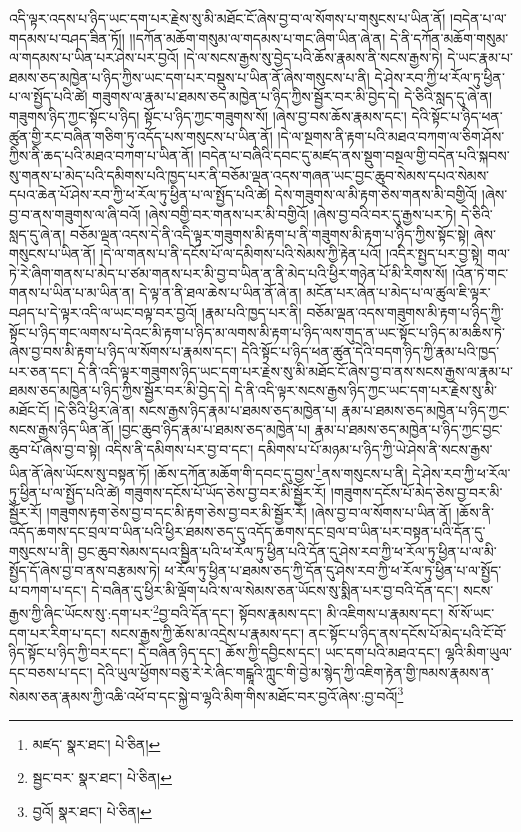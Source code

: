 འདི་ལྟར་འདས་པ་ཉིད་ཡང་དག་པར་རྗེས་སུ་མི་མཐོང་ངོ་ཞེས་བྱ་བ་ལ་སོགས་པ་གསུངས་པ་ཡིན་ནོ། །བདེན་པ་ལ་གདམས་པ་བཤད་ཟིན་ཏོ།། །།དཀོན་མཆོག་གསུམ་ལ་གདམས་པ་གང་ཞིག་ཡིན་ཞེ་ན། དེ་ནི་དཀོན་མཆོག་གསུམ་ལ་གདམས་པ་ཡིན་པར་ཤེས་པར་བྱའོ། །དེ་ལ་སངས་རྒྱས་སུ་བྱེད་པའི་ཆོས་རྣམས་ནི་སངས་རྒྱས་ཏེ། དེ་ཡང་རྣམ་པ་ཐམས་ཅད་མཁྱེན་པ་ཉིད་ཀྱིས་ཡང་དག་པར་བསྡུས་པ་ཡིན་ནོ་ཞེས་གསུངས་པ་ནི། དེ་ཤེས་རབ་ཀྱི་ཕ་རོལ་ཏུ་ཕྱིན་པ་ལ་སྤྱོད་པའི་ཚེ། གཟུགས་ལ་རྣམ་པ་ཐམས་ཅད་མཁྱེན་པ་ཉིད་ཀྱིས་སྦྱོར་བར་མི་བྱེད་དེ། དེ་ཅིའི་སླད་དུ་ཞེ་ན། གཟུགས་ཉིད་ཀྱང་སྟོང་པ་ཉིད། སྟོང་པ་ཉིད་ཀྱང་གཟུགས་སོ། །ཞེས་བྱ་བས་ཆོས་རྣམས་དང་། དེའི་སྟོང་པ་ཉིད་ཕན་ཚུན་གྱི་རང་བཞིན་གཅིག་ཏུ་འདོད་པས་གསུངས་པ་ཡིན་ནོ། །དེ་ལ་སྔགས་ནི་རྟག་པའི་མཐའ་བཀག་ལ་ཅིག་ཤོས་ཀྱིས་ནི་ཆད་པའི་མཐའ་བཀག་པ་ཡིན་ནོ། །བདེན་པ་བཞིའི་དབང་དུ་མཛད་ནས་སྡུག་བསྔལ་གྱི་བདེན་པའི་སྐབས་སུ་གནས་པ་མེད་པའི་དམིགས་པའི་ཁྱད་པར་ནི་བཅོམ་ལྡན་འདས་གཞན་ཡང་བྱང་ཆུབ་སེམས་དཔའ་སེམས་དཔའ་ཆེན་པོ་ཤེས་རབ་ཀྱི་ཕ་རོལ་ཏུ་ཕྱིན་པ་ལ་སྤྱོད་པའི་ཚེ། དེས་གཟུགས་ལ་མི་རྟག་ཅེས་གནས་མི་བགྱིའོ། །ཞེས་བྱ་བ་ནས་གཟུགས་ལ་ཞི་བའོ། །ཞེས་བགྱི་བར་གནས་པར་མི་བགྱིའོ། །ཞེས་བྱ་བའི་བར་དུ་རྒྱས་པར་ཏེ། དེ་ཅིའི་སླད་དུ་ཞེ་ན། བཅོམ་ལྡན་འདས་དེ་ནི་འདི་ལྟར་གཟུགས་མི་རྟག་པ་ནི་གཟུགས་མི་རྟག་པ་ཉིད་ཀྱིས་སྟོང་སྟེ། ཞེས་གསུངས་པ་ཡིན་ནོ། །དེ་ལ་གནས་པ་ནི་དངོས་པོ་ལ་དམིགས་པའི་སེམས་ཀྱི་རྟེན་པའོ། །འདིར་སྤྱད་པར་བྱ་སྟེ། གལ་ཏེ་རེ་ཞིག་གནས་པ་མེད་པ་ཙམ་གནས་པར་མི་བྱ་བ་ཡིན་ན་ནི་མེད་པའི་ཕྱིར་གཉེན་པོ་མི་རིགས་སོ། །འོན་ཏེ་གང་གནས་པ་ཡིན་པ་མ་ཡིན་ན། དེ་ལྟ་ན་ནི་ཐལ་ཆེས་པ་ཡིན་ནོ་ཞེ་ན། མངོན་པར་ཞེན་པ་མེད་པ་ལ་ཚུལ་ཇི་ལྟར་བཤད་པ་དེ་ལྟར་འདི་ལ་ཡང་བལྟ་བར་བྱའོ། །རྣམ་པའི་ཁྱད་པར་ནི། བཅོམ་ལྡན་འདས་གཟུགས་མི་རྟག་པ་ཉིད་ཀྱི་སྟོང་པ་ཉིད་གང་ལགས་པ་དེའང་མི་རྟག་པ་ཉིད་མ་ལགས་མི་རྟག་པ་ཉིད་ལས་གུད་ན་ཡང་སྟོང་པ་ཉིད་མ་མཆིས་ཏེ་ཞེས་བྱ་བས་མི་རྟག་པ་ཉིད་ལ་སོགས་པ་རྣམས་དང་། དེའི་སྟོང་པ་ཉིད་ཕན་ཚུན་དེའི་བདག་ཉིད་ཀྱི་རྣམ་པའི་ཁྱད་པར་ཅན་དང་། དེ་ནི་འདི་ལྟར་གཟུགས་ཉིད་ཡང་དག་པར་རྗེས་སུ་མི་མཐོང་ངོ་ཞེས་བྱ་བ་ནས་སངས་རྒྱས་ལ་རྣམ་པ་ཐམས་ཅད་མཁྱེན་པ་ཉིད་ཀྱིས་སྦྱོར་བར་མི་བྱེད་དེ། དེ་ནི་འདི་ལྟར་སངས་རྒྱས་ཉིད་ཀྱང་ཡང་དག་པར་རྗེས་སུ་མི་མཐོང་ངོ། །དེ་ཅིའི་ཕྱིར་ཞེ་ན། སངས་རྒྱས་ཉིད་རྣམ་པ་ཐམས་ཅད་མཁྱེན་པ། རྣམ་པ་ཐམས་ཅད་མཁྱེན་པ་ཉིད་ཀྱང་སངས་རྒྱས་ཉིད་ཡིན་ནོ། །བྱང་ཆུབ་ཉིད་རྣམ་པ་ཐམས་ཅད་མཁྱེན་པ། རྣམ་པ་ཐམས་ཅད་མཁྱེན་པ་ཉིད་ཀྱང་བྱང་ཆུབ་པོ་ཞེས་བྱ་བ་སྟེ། འདིས་ནི་དམིགས་པར་བྱ་བ་དང་། དམིགས་པ་པོ་མཉམ་པ་ཉིད་ཀྱི་ཡེ་ཤེས་ནི་སངས་རྒྱས་ཡིན་ནོ་ཞེས་ཡོངས་སུ་བསྟན་ཏོ། །ཆོས་དཀོན་མཆོག་གི་དབང་དུ་བྱས་\footnote{མཛད་  སྣར་ཐང་།  པེ་ཅིན། }ནས་གསུངས་པ་ནི། དེ་ཤེས་རབ་ཀྱི་ཕ་རོལ་ཏུ་ཕྱིན་པ་ལ་སྤྱོད་པའི་ཚེ། གཟུགས་དངོས་པོ་ཡོད་ཅེས་བྱ་བར་མི་སྦྱོར་རོ། །གཟུགས་དངོས་པོ་མེད་ཅེས་བྱ་བར་མི་སྦྱོར་རོ། །གཟུགས་རྟག་ཅེས་བྱ་བ་དང་མི་རྟག་ཅེས་བྱ་བར་མི་སྦྱོར་རོ། །ཞེས་བྱ་བ་ལ་སོགས་པ་ཡིན་ནོ། །ཆོས་ནི་འདོད་ཆགས་དང་བྲལ་བ་ཡིན་པའི་ཕྱིར་ཐམས་ཅད་དུ་འདོད་ཆགས་དང་བྲལ་བ་ཡིན་པར་བསྟན་པའི་དོན་དུ་གསུངས་པ་ནི། བྱང་ཆུབ་སེམས་དཔའ་སྦྱིན་པའི་ཕ་རོལ་ཏུ་ཕྱིན་པའི་དོན་དུ་ཤེས་རབ་ཀྱི་ཕ་རོལ་ཏུ་ཕྱིན་པ་ལ་མི་སྤྱོད་དོ་ཞེས་བྱ་བ་ནས་བརྩམས་ཏེ། ཕ་རོལ་ཏུ་ཕྱིན་པ་ཐམས་ཅད་ཀྱི་དོན་དུ་ཤེས་རབ་ཀྱི་ཕ་རོལ་ཏུ་ཕྱིན་པ་ལ་སྤྱོད་པ་བཀག་པ་དང་། དེ་བཞིན་དུ་ཕྱིར་མི་ལྡོག་པའི་ས་ལ་སེམས་ཅན་ཡོངས་སུ་སྨིན་པར་བྱ་བའི་དོན་དང་། སངས་རྒྱས་ཀྱི་ཞིང་ཡོངས་སུ་:དག་པར་\footnote{སྦྱང་བར་  སྣར་ཐང་།  པེ་ཅིན། }བྱ་བའི་དོན་དང་། སྟོབས་རྣམས་དང་། མི་འཇིགས་པ་རྣམས་དང་། སོ་སོ་ཡང་དག་པར་རིག་པ་དང་། སངས་རྒྱས་ཀྱི་ཆོས་མ་འདྲེས་པ་རྣམས་དང་། ནང་སྟོང་པ་ཉིད་ནས་དངོས་པོ་མེད་པའི་ངོ་བོ་ཉིད་སྟོང་པ་ཉིད་ཀྱི་བར་དང་། དེ་བཞིན་ཉིད་དང་། ཆོས་ཀྱི་དབྱིངས་དང་། ཡང་དག་པའི་མཐའ་དང་། ལྷའི་མིག་ཡུལ་དང་བཅས་པ་དང་། དེའི་ཡུལ་ཕྱོགས་བཅུ་རེ་རེ་ཞིང་གངྒཱའི་ཀླུང་གི་བྱེ་མ་སྙེད་ཀྱི་འཇིག་རྟེན་གྱི་ཁམས་རྣམས་ན་སེམས་ཅན་རྣམས་ཀྱི་འཆི་འཕོ་བ་དང་སྐྱེ་བ་ལྷའི་མིག་གིས་མཐོང་བར་བྱའོ་ཞེས་:བྱ་བའོ།\footnote{བྱའོ།  སྣར་ཐང་།  པེ་ཅིན། } 